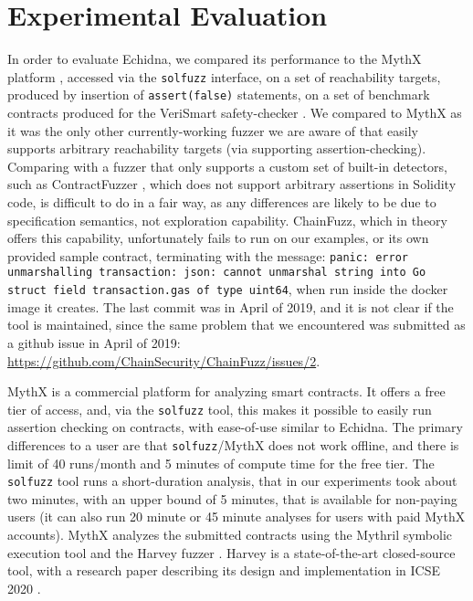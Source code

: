 \section{Experimental Evaluation}

In order to evaluate Echidna, we compared its performance to the MythX platform \cite{mythx}, accessed via the {\tt solfuzz} \cite{solfuzz} interface, on a set of reachability targets, produced by insertion of {\tt assert(false)} statements, on a set of benchmark contracts \cite{vsbenchmark} produced for the VeriSmart safety-checker \cite{VeriSmart}.  We compared to MythX as it was the only other currently-working fuzzer we are aware of that easily supports arbitrary reachability targets (via supporting assertion-checking).  Comparing with a fuzzer that only supports a custom set of built-in detectors, such as ContractFuzzer \cite{contractfuzzer}, which does not support arbitrary assertions in Solidity code, is difficult to do in a fair way, as any differences are likely to be due to specification semantics, not exploration capability.  ChainFuzz, which in theory offers this capability, unfortunately fails to run on our examples, or its own provided sample contract, terminating with the message: {\tt panic: error unmarshalling transaction: json: cannot unmarshal string into Go struct field transaction.gas of type uint64}, when run inside the docker image it creates.  The last commit was in April of 2019, and it is not clear if the tool is maintained, since the same problem that we encountered was submitted as a github issue in April of 2019:  \url{https://github.com/ChainSecurity/ChainFuzz/issues/2}.

MythX is a commercial platform for analyzing smart contracts.  It offers a free tier of access, and, via the {\tt solfuzz} tool, this makes it possible to easily run assertion checking on contracts, with ease-of-use similar to Echidna.  The primary differences to a user are that {\tt solfuzz}/MythX does not work offline, and there is limit of 40 runs/month and 5 minutes of compute time for the free tier.  The {\tt solfuzz} tool runs a short-duration analysis, that in our experiments took about two minutes, with an upper bound of 5 minutes, that is available for non-paying users (it can also run 20 minute or 45 minute analyses for users with paid MythX accounts).  MythX analyzes the submitted contracts using the Mythril symbolic execution tool \cite{mythril-code} and the Harvey fuzzer \cite{harvey}.  Harvey is a state-of-the-art closed-source tool, with a research paper describing its design and implementation in ICSE 2020 \cite{harvey}.


